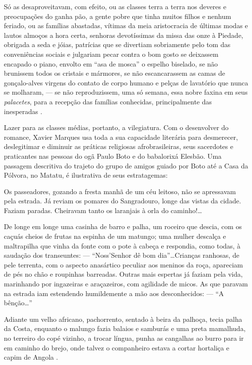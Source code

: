 \begin{citacao}
Só as desaproveitavam, com efeito, ou as classes terra a terra nos deveres e preocupações do ganha pão, a gente pobre que tinha muitos filhos e nenhum feriado, ou as famílias abastadas, vítimas da meia aristocracia de últimas modas e lautos almoços a hora certa, senhoras devotíssimas da missa das onze à Piedade, obrigada a seda e jóias, patrícias que se divertiam sobriamente pelo tom das conveniências sociais e julgariam pecar contra o bom gosto se deixassem encapado o piano, envolto em ``asa de mosca'' o espelho biselado, se não brunissem todos os cristais e mármores, se não escancarassem as camas de gonçalo-alves virgens do contato de corpo humano e pelças de lavatório que nunca se molharam, --- se não reproduzissem, uma só semana, essa nobre faxina em seus \textit{palacetes}, para a recepção das famílias conhecidas, principalmente das inesperadas \cite[pp.~4-5]{marques_feiticeiro_1975}.
\end{citacao}

Lazer para as classes médias, portanto, a vilegiatura. Com o desenvolver do romance, Xavier Marques usa toda a sua capacidade literária para desmerecer, deslegitimar e diminuir as práticas religiosas afrobrasileiras, seus sacerdotes e praticantes nas pessoas do ogã Paulo Boto e do babalorixá Elesbão. Uma passagem descritiva do trajeto do grupo de amigos guiado por Boto até a Casa da Pólvora, no Matatu, é ilustrativa de seus estratagemas:

\begin{citacao}
Os passeadores, gozando a fresta manhã de um céu leitoso, não se apressavam pela estrada. Já reviam os pomares do Sangradouro, longe das vistas da cidade. Faziam paradas. Cheiravam tanto os laranjais à orla do caminho!\dots

De longe em longe uma casinha de barro e palha, um roceiro que descia, com os caçuás cheios de frutas na espinha de um matungo; uma mulher descalça e maltrapilha que vinha da fonte com o pote à cabeça e respondia, como todas, à saudação dos transeuntes: --- ``Noss'Senhor dê bom dia''\dots Crianças ranhosas, de pele terrenta, com o aspecto anasártico peculiar aos meninos da roça, apareciam de pés no chão e roupinhas barreadas. Outras mais espertas já faziam pela vida, marinhando por ingazeiras e araçazeiros, com agilidade de micos. As que paravam na estrada iam estendendo humildemente a mão aos desconhecidos: --- ``A bênção\dots''

Adiante um velho africano, pachorrento, sentado à beira da palhoça, tecia palha da Costa, enquanto o malungo fazia balaios e samburás e uma preta mamalhuda, no terreiro do copé vizinho, a trocar língua, punha as cangalhas ao burro para ir em caminho do brejo, onde talvez o companheiro estava a cortar hortaliça e capim de Angola \cite[pp.~4-5]{marques_feiticeiro_1975}.
\end{citacao}

